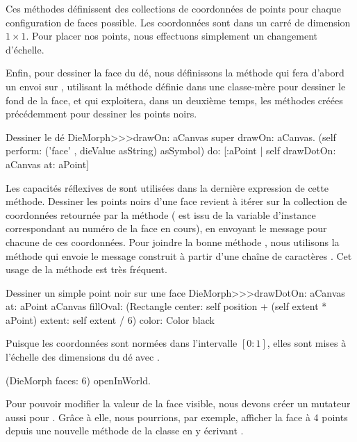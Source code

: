 \documentclass[a4paper,10pt,twoside]{book}
\begin{document}
Ces méthodes définissent des collections de coordonnées de
points pour chaque configuration de faces possible. Les coordonnées
sont dans un carré de dimension $1\times1$. Pour placer nos points,
nous effectuons simplement un changement d'échelle.

Enfin, pour dessiner la face du dé, nous définissons la méthode
 qui fera d'abord un envoi sur , utilisant la méthode
définie dans une classe-mère pour dessiner le fond de la face, et
qui exploitera, dans un deuxième temps, les méthodes créées
précédemment pour dessiner les points noirs.

\begin{method}{Dessiner le dé}
DieMorph>>>drawOn: aCanvas
	super drawOn: aCanvas.
	(self perform: ('face' , dieValue asString) asSymbol)
		do: [:aPoint | self drawDotOn: aCanvas at: aPoint]
\end{method}

Les capacités réflexives de \st sont utilisées dans la
dernière expression de cette méthode. Dessiner les points noirs
d'une face revient \`a itérer sur la collection 
de coordonnées retournée par la méthode  
( est issu de la variable d'instance 
correspondant au numéro de la face en cours),
en envoyant le message  pour chacune de ces
coordonnées. Pour joindre la bonne méthode %
, nous utilisons la méthode  qui
envoie le message construit \`a partir d'une chaîne de
caractères .
Cet usage de la méthode  est très fréquent.

\begin{method}{Dessiner un simple point noir sur une face}
DieMorph>>>drawDotOn: aCanvas at: aPoint
	aCanvas
		fillOval: (Rectangle
			center: self position + (self extent * aPoint)
			extent: self extent / 6)
		color: Color black
\end{method}

Puisque les coordonnées sont normées dans l'intervalle $[0{:}1]$,
elles sont mises \`a l'échelle des dimensions du dé avec 
.

\begin{code}{}
(DieMorph faces: 6) openInWorld.
\end{code}

Pour pouvoir modifier la valeur de la face visible, nous devons
créer un mutateur aussi pour . 
Grâce \`a elle, nous pourrions, par exemple, afficher la face \`a 4
points depuis une nouvelle méthode de la classe en y écrivant
.
\end{document}
